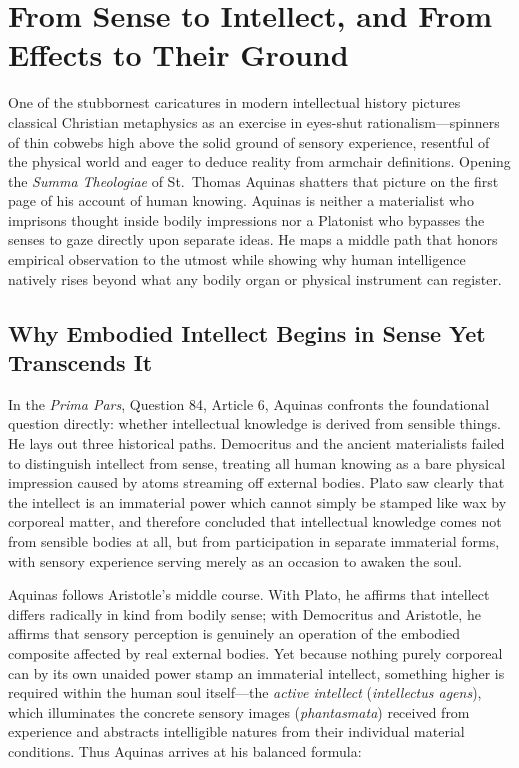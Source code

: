 \section{From Sense to Intellect, and From Effects to Their Ground}

One of the stubbornest caricatures in modern intellectual history pictures classical Christian metaphysics as an exercise in eyes-shut rationalism---spinners of thin cobwebs high above the solid ground of sensory experience, resentful of the physical world and eager to deduce reality from armchair definitions. Opening the \emph{Summa Theologiae} of St.\ Thomas Aquinas shatters that picture on the first page of his account of human knowing. Aquinas is neither a materialist who imprisons thought inside bodily impressions nor a Platonist who bypasses the senses to gaze directly upon separate ideas. He maps a middle path that honors empirical observation to the utmost while showing why human intelligence natively rises beyond what any bodily organ or physical instrument can register.

\subsection{Why Embodied Intellect Begins in Sense Yet Transcends It}

In the \emph{Prima Pars}, Question 84, Article 6, Aquinas confronts the foundational question directly: whether intellectual knowledge is derived from sensible things. He lays out three historical paths. Democritus and the ancient materialists failed to distinguish intellect from sense, treating all human knowing as a bare physical impression caused by atoms streaming off external bodies. Plato saw clearly that the intellect is an immaterial power which cannot simply be stamped like wax by corporeal matter, and therefore concluded that intellectual knowledge comes not from sensible bodies at all, but from participation in separate immaterial forms, with sensory experience serving merely as an occasion to awaken the soul.

Aquinas follows Aristotle's middle course. With Plato, he affirms that intellect differs radically in kind from bodily sense; with Democritus and Aristotle, he affirms that sensory perception is genuinely an operation of the embodied composite affected by real external bodies. Yet because nothing purely corporeal can by its own unaided power stamp an immaterial intellect, something higher is required within the human soul itself---the \emph{active intellect} (\emph{intellectus agens}), which illuminates the concrete sensory images (\emph{phantasmata}) received from experience and abstracts intelligible natures from their individual material conditions. Thus Aquinas arrives at his balanced formula:

